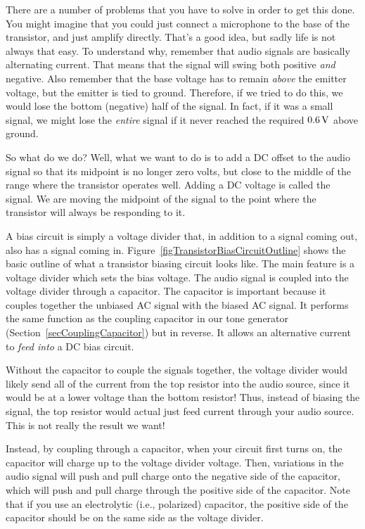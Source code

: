 There are a number of problems that you have to solve in order to get this done.
You might imagine that you could just connect a microphone to the base of the transistor, and just amplify directly.
That's a good idea, but sadly life is not always that easy.
To understand why, remember that audio signals are basically alternating current.
That means that the signal will swing both positive \emph{and} negative.
Also remember that the base voltage has to remain \emph{above} the emitter voltage, but the emitter is tied to ground.
Therefore, if we tried to do this, we would lose the bottom (negative) half of the signal.
In fact, if it was a small signal, we might lose the \emph{entire} signal if it never reached the required $0.6\,\si{\volt}$ above ground.

So what do we do?
Well, what we want to do is to add a DC offset to the audio signal so that its midpoint is no longer zero volts, but close to the middle of the range where the transistor operates well.
Adding a DC voltage is called  the signal.
We are moving the midpoint of the signal to the point where the transistor will always be responding to it.


A bias circuit is simply a voltage divider that, in addition to a signal coming out, also has a signal coming in.
Figure~\ref{figTransistorBiasCircuitOutline} shows the basic outline of what a transistor biasing circuit looks like.
The main feature is a voltage divider which sets the bias voltage.
The audio signal is coupled into the voltage divider through a capacitor.
The capacitor is important because it couples together the unbiased AC signal with the biased AC signal. 
It performs the same function as the coupling capacitor in our tone generator (Section~\ref{secCouplingCapacitor}) but in reverse.
It allows an alternative current to \emph{feed into} a DC bias circuit.

Without the capacitor to couple the signals together, the voltage divider would likely send all of the current from the top resistor into the audio source, since it would be at a lower voltage than the bottom resistor!
Thus, instead of biasing the signal, the top resistor would actual just feed current through your audio source.
This is not really the result we want!

Instead, by coupling through a capacitor, when your circuit first turns on, the capacitor will charge up to the voltage divider voltage.
Then, variations in the audio signal will push and pull charge onto the negative side of the capacitor, which will push and pull charge through the positive side of the capacitor.
Note that if you use an electrolytic (i.e., polarized) capacitor, the positive side of the capacitor should be on the same side as the voltage divider.

